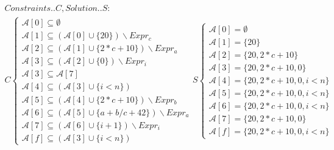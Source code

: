 \documentclass[11pt,a4paper]{scrartcl}
\begin{document}
\begin{align*}
Constraints..C, Solution..S:\\
C
\left\{ \begin{array}{l}
\mathcal{A}[0] \subseteq \emptyset\\
\mathcal{A}[1] \subseteq (\mathcal{A}[0] \cup \{20\}) \backslash Expr_c\\
\mathcal{A}[2] \subseteq (\mathcal{A}[1] \cup \{2*c+10\}) \backslash Expr_a\\
\mathcal{A}[3] \subseteq (\mathcal{A}[2] \cup \{0\}) \backslash Expr_i\\
\mathcal{A}[3] \subseteq \mathcal{A}[7]\\
\mathcal{A}[4] \subseteq (\mathcal{A}[3] \cup \{i<n\})\\
\mathcal{A}[5] \subseteq (\mathcal{A}[4] \cup \{2*c+10\}) \backslash Expr_b\\
\mathcal{A}[6] \subseteq (\mathcal{A}[5] \cup \{a+b/c+42\}) \backslash Expr_a\\
\mathcal{A}[7] \subseteq (\mathcal{A}[6] \cup \{i+1\}) \backslash Expr_i\\
\mathcal{A}[f] \subseteq (\mathcal{A}[3] \cup \{i<n\})
\end{array}\right.
S
\left\{ \begin{array}{l}
\mathcal{A}[0] = \emptyset\\
\mathcal{A}[1] = \{20\}\\
\mathcal{A}[2] = \{20, 2*c+10\}\\
\mathcal{A}[3] = \{20, 2*c+10, 0\}\\
\mathcal{A}[4] = \{20, 2*c+10, 0, i<n\}\\
\mathcal{A}[5] = \{20, 2*c+10, 0, i<n\}\\
\mathcal{A}[6] = \{20, 2*c+10, 0, i<n\}\\
\mathcal{A}[7] = \{20, 2*c+10, 0\}\\
\mathcal{A}[f] = \{20, 2*c+10, 0, i<n\}
\end{array}\right.
\end{align*}
\end{document}
